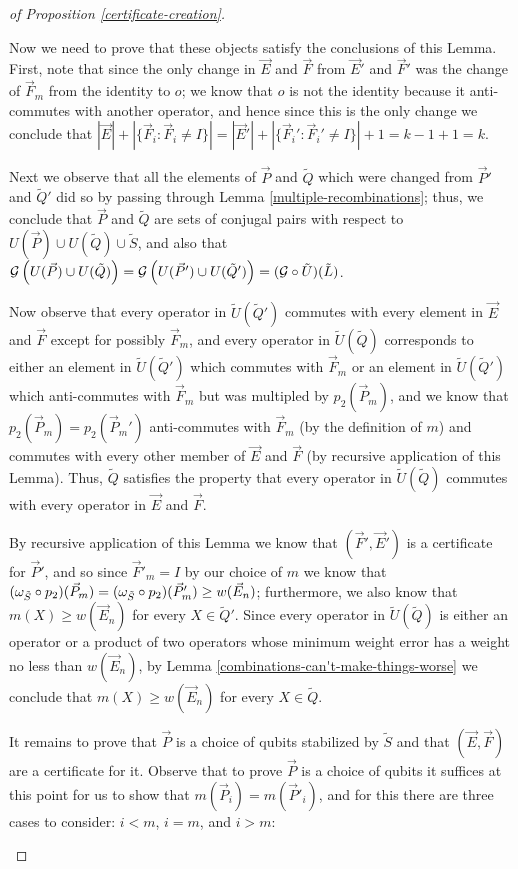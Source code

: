 \documentclass[twocolumn,showpacs,preprintnumbers,amsmath,amssymb,nofootinbib,pra,floatfix]{revtex4-1}
\newcommand{\lst}{\vec}
\newcommand{\set}{\tilde}
\newcommand{\genfun}{\mathcal{G}}
\begin{document}
\begin{proof}[of Proposition \ref{certificate-creation}]
\begin{description}
Now we need to prove that these objects satisfy the conclusions of this Lemma.  First, note that since the only change in $\lst E$ and $\lst F$ from $\lst E'$ and $\lst F'$ was the change of $\lst F_m$ from the identity to $o$;  we know that $o$ is not the identity because it anti-commutes with another operator, and hence since this is the only change we conclude that $|\lst E|+|\{\lst F_i : \lst F_i\ne I\}|=|\lst E'|+|\{\lst F_i' : \lst F_i'\ne I\}|+1=k-1+1=k$.

Next we observe that all the elements of $\lst P$ and $\set Q$ which were changed from $\lst P'$ and $\set Q'$ did so by passing through Lemma \ref{multiple-recombinations};  thus, we conclude that $\lst P$ and $\set Q$ are sets of conjugal pairs with respect to $U(\lst P)\cup U(\set Q)\cup \set S$, and also that $\genfun\paren{U(\lst P)\cup U(\set Q)}=\genfun\paren{U(\lst P')\cup U(\set Q')}=(\genfun\circ\set U)(\set L)$.

Now observe that every operator in $\set U(\set Q')$ commutes with every element in $\lst E$ and $\lst F$ except for possibly $\lst F_m$, and every operator in $\set U(\set Q)$ corresponds to either an element in $\set U(\set Q')$ which commutes with $\lst F_m$ or an element in $\set U(\set Q')$ which anti-commutes with $\lst F_m$ but was multipled by $p_2(\lst P_m)$, and we know that $p_2(\lst P_m)=p_2(\lst P_m')$ anti-commutes with $\lst F_m$ (by the definition of $m$) and commutes with every other member of $\lst E$ and $\lst F$ (by recursive application of this Lemma).  Thus, $\set Q$ satisfies the property that every operator in $\set U(\set Q)$ commutes with every operator in $\lst E$ and $\lst F$.

By recursive application of this Lemma we know that $(\lst F',\lst E')$ is a certificate for $\lst P'$, and so since $\lst F'_m=I$ by our choice of $m$ we know that $(\om_{\set S}\circ p_2)(\lst P_m)=(\om_{\set S}\circ p_2)(\lst P_m')\ge w(\lst E_n)$;  furthermore, we also know that $m(X)\ge w(\lst E_n)$ for every $X\in \set Q'$.  Since every operator in $\set U(\set Q)$ is either an operator or a product of two operators whose minimum weight error has a weight no less than $w(\lst E_n)$, by Lemma \ref{combinations-can't-make-things-worse} we conclude that $m(X)\ge w(\lst E_n)$ for every $X\in \set Q$.

It remains to prove that $\lst P$ is a choice of qubits stabilized by $\set S$ and that $(\lst E,\lst F)$ are a certificate for it.  Observe that to prove $\lst P$ is a choice of qubits it suffices at this point for us to show that $m(\lst P_i)=m(\lst P'_i)$, and for this there are three cases to consider: $i<m$, $i=m$, and $i>m$:


\end{description}
\end{proof}
\end{document}
